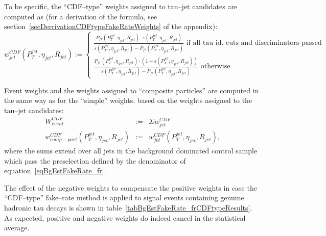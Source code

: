 To be specific, the ``CDF--type'' weights assigned to tau--jet candidates are computed as
(for a derivation of the formula, see section~\ref{secDerrivationCDFtypeFakeRateWeights} of the appendix):
\begin{equation}
w_{jet}^{CDF} \left( P_{T}^{jet}, \eta_{jet}, R_{jet} \right) 
:= 
\begin{cases} 
   \frac{P_{fr} \left( P_{T}^{jet}, \eta_{jet}, R_{jet} \right) \cdot 
         \varepsilon \left( P_{T}^{jet}, \eta_{jet}, R_{jet} \right)}
        {\varepsilon \left( P_{T}^{jet}, \eta_{jet}, R_{jet} \right) - P_{fr} \left( P_{T}^{jet}, \eta_{jet}, R_{jet} \right)}
      \mbox{ if all tau id. cuts and discriminators passed} \\
   \frac{P_{fr} \left( P_{T}^{jet}, \eta_{jet}, R_{jet} \right) \cdot 
         \left( 1 - \varepsilon \left( P_{T}^{jet}, \eta_{jet}, R_{jet} \right) \right)}
        {\varepsilon \left( P_{T}^{jet}, \eta_{jet}, R_{jet} \right) - P_{fr} \left( P_{T}^{jet}, \eta_{jet}, R_{jet} \right)}
      \mbox{ otherwise}
\end{cases}
\label{eqBgEstFakeRate_frCDFtypeJetWeight}
\end{equation}

Event weights and the weights assigned to ``composite particles'' 
are computed in the same way as for the ``simple'' weights,
based on the weights assigned to the tau--jet candidates:
\begin{eqnarray}
W_{event}^{CDF} & := & \Sigma w_{jet}^{CDF} \nonumber \\
w_{comp-part}^{CDF} \left( P_{T}^{jet}, \eta_{jet}, R_{jet} \right) & := & 
  w_{jet}^{CDF} \left( P_{T}^{jet}, \eta_{jet}, R_{jet} \right),
\label{eqBgEstFakeRate_frCDFtypeEvent_and_CompositeParticleWeight}
\end{eqnarray}
where the sums extend over all jets in the background dominated control sample which pass the preselection defined by 
the denominator of equation~\ref{eqBgEstFakeRate_fr}.

The effect of the negative weights to compensate the positive weights
in case the ``CDF--type'' fake--rate method is applied 
to signal events containing genuine hadronic tau decays 
is shown in table~\ref{tabBgEstFakeRate_frCDFtypeResults}.
As expected, positive and negative weights do indeed cancel
in the statistical average.

